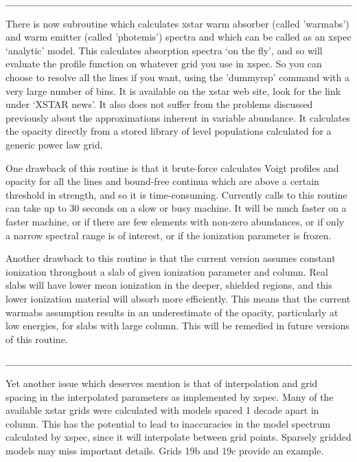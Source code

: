 \begin{verbatim}
_________________________________________________________________________________
\end{verbatim}

There is now subroutine which calculates xstar warm absorber (called 'warmabs') and 
warm emitter (called 'photemis') spectra and which can be called as 
an xspec `analytic' model.  This calculates absorption spectra
`on the fly', and so  will evaluate the profile 
function on whatever grid you use in xspec.  So you can choose to resolve 
all the lines if you want, using the 'dummyrsp' command with a very large number 
of bins.  It is available on the xstar web site, look for the link under `XSTAR news'.
It also does not suffer from the problems discussed previously about the 
approximations inherent in variable abundance.  It calculates the 
opacity directly from a stored library of level populations calculated for a
generic power law grid.  

One drawback of this routine is that it brute-force 
calculates Voigt profiles and opacity for all the lines and bound-free
continua which are above a certain threshold in strength, and so it is time-consuming.
Currently calls to this routine can take up to 30 seconds on a slow or busy machine. 
It will be much faster on a faster machine, or if there are few elements with non-zero 
abundances, or if only a narrow spectral range is of interest, or if the 
ionization parameter is frozen.

Another drawback to this routine is that the current version assumes 
constant ionization throughout a slab of given ionization parameter and column.
Real slabs will have lower mean ionization in the deeper, shielded regions, and 
this lower ionization material will absorb more efficiently.
This means that the current warmabs assumption results in an 
underestimate of the opacity, particularly at low energies,
for slabs with large column.  This will be remedied in future versions of this routine.


\begin{verbatim}
_________________________________________________________________________________
\end{verbatim}

Yet another issue which deserves mention is that of interpolation and grid 
spacing in the interpolated parameters as implemented by xspec.  Many of the 
available xstar grids were calculated with models spaced 1 decade apart in column.
This has the potential to lead to inaccuracies in the model spectrum calculated 
by xspec, since it will interpolate between grid points.  Sparsely gridded 
models may miss important details.  Grids 19b and 19c provide an example.


